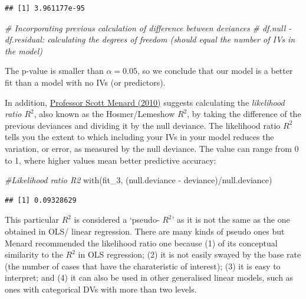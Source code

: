 \documentclass[
]{book}
\newenvironment{Shaded}{\begin{snugshade}}{\end{snugshade}}
\newcommand{\CommentTok}[1]{\textcolor[rgb]{0.56,0.35,0.01}{\textit{#1}}}
\newcommand{\FunctionTok}[1]{\textcolor[rgb]{0.00,0.00,0.00}{#1}}
\newcommand{\NormalTok}[1]{#1}
\newcommand{\SpecialCharTok}[1]{\textcolor[rgb]{0.00,0.00,0.00}{#1}}
\begin{document}
\begin{verbatim}
## [1] 3.961177e-95
\end{verbatim}

\begin{Shaded}
\begin{Highlighting}[]
\CommentTok{\# Incorporating previous calculation of difference between deviances}
\CommentTok{\# df.null {-} df.residual: calculating the degrees of freedom (should equal the number of IVs in the model)}
\end{Highlighting}
\end{Shaded}

The p-value is smaller than \(\alpha = 0.05\), so we conclude that our model is a better fit than a model with no IVs (or predictors).

In addition, \href{https://methods.sagepub.com/book/logistic-regression-from-introductory-to-advanced-concepts-and-applications}{Professor Scott Menard (2010)} suggests calculating the \emph{likelihood ratio \(R^2\)}, also known as the Hosmer/Lemeshow \(R^2\), by taking the difference of the previous deviances and dividing it by the null deviance. The likelihood ratio \(R^2\) tells you the extent to which including your IVs in your model reduces the variation, or error, as measured by the null deviance. The value can range from 0 to 1, where higher values mean better predictive accuracy:

\begin{Shaded}
\begin{Highlighting}[]
\CommentTok{\#Likelihood ratio R2}
\FunctionTok{with}\NormalTok{(fit\_3, (null.deviance }\SpecialCharTok{{-}}\NormalTok{ deviance)}\SpecialCharTok{/}\NormalTok{null.deviance)}
\end{Highlighting}
\end{Shaded}

\begin{verbatim}
## [1] 0.09328629
\end{verbatim}

This particular \(R^2\) is considered a `pseudo- \(R^2\)' as it is not the same as the one obtained in OLS/ linear regression. There are many kinds of pseudo ones but Menard recommended the likelihood ratio one because (1) of its conceptual similarity to the \(R^2\) in OLS regression; (2) it is not easily swayed by the base rate (the number of cases that have the charateristic of interest); (3) it is easy to interpret; and (4) it can also be used in other generalised linear models, such as ones with categorical DVs with more than two levels.
\end{document}
